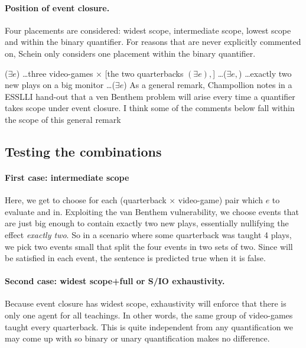 \paragraph{Position of event closure.} Four placements are considered: widest scope, intermediate scope, lowest scope and within the binary quantifier. For reasons that are never explicitly commented on, Schein only considers one placement within the binary quantifier.

\ex
($\exists e$) \ldots three video-games $\times$ [the two quarterbacks $(\exists e),$] \ldots ($\exists e,$) \ldots exactly two new plays on a big monitor \ldots ($\exists e$)
\xe
%
As a general remark, Champollion notes in a ESSLLI hand-out that a ven Benthem problem will arise every time a quantifier takes scope under event closure. I think some of the comments below fall within the scope of this general remark

\subsection{Testing the combinations}
\paragraph{First case: intermediate scope} Here, we get to choose for each (quarterback $\times$ video-game) pair which $e$ to evaluate  and  in. Exploiting the van Benthem vulnerability, we choose events that are just big enough to contain exactly two new plays, essentially nullifying the effect \emph{exactly two}. So in a scenario where some quarterback was taught 4 plays, we pick two events small that split the four events in two sets of two. Since  will be satisfied in each event, the sentence is predicted true when it is false.


\ex \label{cutoff}
\renewcommand{\scale}{0.75}

\xe
%


\paragraph{Second case: widest scope+full or S/IO exhaustivity.} Because event closure has widest scope, exhaustivity will enforce that there is only one agent for all teachings. In other words, the same group of video-games taught every quarterback. This is quite independent from any quantification we may come up with so binary or unary quantification makes no difference.

